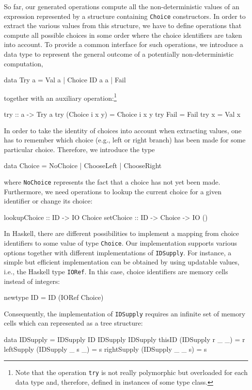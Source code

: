 \documentclass{llncs}
\newcommand{\code}[1]{\mbox{\small\texttt{#1}}}
\begin{document}
So far, our generated operations compute all the non-deterministic
values of an expression represented by a structure containing
\code{Choice} constructors. In order to extract the various
values from this structure, we have to define operations
that compute all possible choices in some order where the choice identifiers
are taken into account.
To provide a common interface for such operations, we introduce
a data type to represent the general outcome of a potentially
non-deterministic computation,
\begin{haskell}
  data Try a = Val a | Choice ID a a | Fail
\end{haskell}
together with an auxiliary operation:\footnote{Note that the
operation \code{try} is not really polymorphic but overloaded
for each data type and, therefore, defined in instances of some type class.}
\begin{haskell}
  try :: a -> Try a
  try (Choice i x y) = Choice i x y
  try Fail           = Fail
  try x              = Val x
\end{haskell}
In order to take the identity of choices into account when extracting values,
one has to remember which choice (e.g., left or right branch)
has been made for some particular choice.
Therefore, we introduce the type
\begin{haskell}
  data Choice = NoChoice | ChooseLeft | ChooseRight
\end{haskell}
where \code{NoChoice} represents the fact that a choice has not yet been made.
Furthermore, we need operations to lookup the current choice
for a given identifier or change its choice:
\begin{haskell}
  lookupChoice :: ID -> IO Choice
  setChoice    :: ID -> Choice -> IO ()
\end{haskell}
In Haskell, there are different possibilities to implement a mapping
from choice identifiers to some value of type \code{Choice}.
Our implementation supports various options together with different
implementations of \code{IDSupply}.
For instance, a simple but efficient implementation can be obtained by
using updatable values, i.e., the Haskell type \code{IORef}.
In this case, choice identifiers are memory cells instead of integers:
\begin{haskell}
  newtype ID = ID (IORef Choice)
\end{haskell}
Consequently, the implementation of \code{IDSupply} requires
an infinite set of memory cells which can represented as a tree structure:
\begin{haskell}
  data IDSupply = IDSupply ID IDSupply IDSupply
  thisID      (IDSupply r _ _) = r
  leftSupply  (IDSupply _ s _) = s
  rightSupply (IDSupply _ _ s) = s
  \end{haskell}
\end{document}
